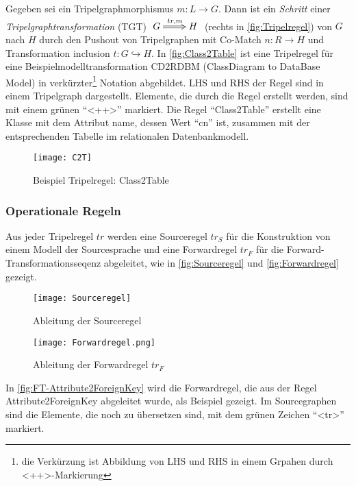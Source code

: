 Gegeben sei ein Tripelgraphmorphismus $m:L \to G$. Dann ist ein \emph{Schritt} einer  \emph{Tripelgraphtransformation} (TGT)  $\xymatrix{G \ar@{=>}[r]^{tr,m} & H}$ (rechts in \autoref{fig:Tripelregel}) von $G$ nach $H$ durch den Pushout von Tripelgraphen mit Co-Match $n: R \to H$ und Transformation inclusion $t: G \hookrightarrow H$.
In \autoref{fig:Class2Table} ist eine Tripelregel für eine Beispielmodelltransformation CD2RDBM (ClassDiagram to DataBase Model) in verkürzter\footnote{die Verkürzung ist Abbildung von LHS und RHS in einem Grpahen durch <++>-Markierung} Notation abgebildet. LHS und RHS der Regel sind in einem Tripelgraph dargestellt. Elemente, die durch die Regel erstellt werden, sind mit einem grünen "`<++>"' markiert. Die Regel "`Class2Table"' erstellt eine Klasse mit dem Attribut name, dessen Wert "`cn"' ist, zusammen mit der entsprechenden Tabelle im relationalen Datenbankmodell.

\begin{figure}[h!] %
	\centering
	\texttt{[image: C2T]}
	\caption{Beispiel Tripelregel: Class2Table}
	\label{fig:Class2Table}
\end{figure}

\subsubsection{Operationale Regeln}
Aus jeder Tripelregel $tr$ werden eine Sourceregel $tr_S$ für die Konstruktion von einem Modell der Sourcesprache und eine Forwardregel $tr_F$ für die Forward-Transformationsseqenz abgeleitet, wie in \autoref{fig:Sourceregel} und \autoref{fig:Forwardregel} gezeigt.

\begin{figure}[h!]%
	\centering
	\texttt{[image: Sourceregel]}
	\caption{Ableitung der Sourceregel}
	\label{fig:Sourceregel}
\end{figure}

\begin{figure}[h!]%
	\centering
	\texttt{[image: Forwardregel.png]}
	\caption{Ableitung der Forwardregel $tr_F$}
	\label{fig:Forwardregel}
\end{figure}

In \autoref{fig:FT-Attribute2ForeignKey} wird die Forwardregel, die aus der Regel Attribute2ForeignKey abgeleitet wurde, als Beispiel gezeigt. Im Sourcegraphen sind die Elemente, die noch zu übersetzen sind, mit dem grünen Zeichen "`<tr>"' markiert.


